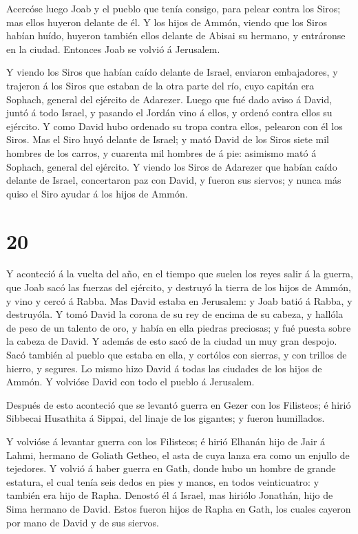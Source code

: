  Acercóse luego Joab y el pueblo que tenía consigo, para
pelear contra los Siros; mas ellos huyeron delante de él. 
Y los hijos de Ammón, viendo que los Siros habían huído, huyeron también
ellos delante de Abisai su hermano, y entráronse en la ciudad. Entonces
Joab se volvió á Jerusalem.

 Y viendo los Siros que habían caído delante de Israel,
enviaron embajadores, y trajeron á los Siros que estaban de la otra
parte del río, cuyo capitán era Sophach, general del ejército de
Adarezer.  Luego que fué dado aviso á David, juntó á todo
Israel, y pasando el Jordán vino á ellos, y ordenó contra ellos su
ejército. Y como David hubo ordenado su tropa contra ellos, pelearon con
él los Siros.  Mas el Siro huyó delante de Israel; y mató
David de los Siros siete mil hombres de los carros, y cuarenta mil
hombres de á pie: asimismo mató á Sophach, general del ejército.
 Y viendo los Siros de Adarezer que habían caído delante de
Israel, concertaron paz con David, y fueron sus siervos; y nunca más
quiso el Siro ayudar á los hijos de Ammón.

\hypertarget{section-19}{%
\section{20}\label{section-19}}

 Y aconteció á la vuelta del año, en el tiempo que suelen
los reyes salir á la guerra, que Joab sacó las fuerzas del ejército, y
destruyó la tierra de los hijos de Ammón, y vino y cercó á Rabba. Mas
David estaba en Jerusalem: y Joab batió á Rabba, y destruyóla.
 Y tomó David la corona de su rey de encima de su cabeza, y
hallóla de peso de un talento de oro, y había en ella piedras preciosas;
y fué puesta sobre la cabeza de David. Y además de esto sacó de la
ciudad un muy gran despojo.  Sacó también al pueblo que
estaba en ella, y cortólos con sierras, y con trillos de hierro, y
segures. Lo mismo hizo David á todas las ciudades de los hijos de Ammón.
Y volvióse David con todo el pueblo á Jerusalem.

 Después de esto aconteció que se levantó guerra en Gezer
con los Filisteos; é hirió Sibbecai Husathita á Sippai, del linaje de
los gigantes; y fueron humillados.

 Y volvióse á levantar guerra con los Filisteos; é hirió
Elhanán hijo de Jair á Lahmi, hermano de Goliath Getheo, el asta de cuya
lanza era como un enjullo de tejedores.  Y volvió á haber
guerra en Gath, donde hubo un hombre de grande estatura, el cual tenía
seis dedos en pies y manos, en todos veinticuatro: y también era hijo de
Rapha.  Denostó él á Israel, mas hiriólo Jonathán, hijo de
Sima hermano de David.  Estos fueron hijos de Rapha en Gath,
los cuales cayeron por mano de David y de sus siervos.

